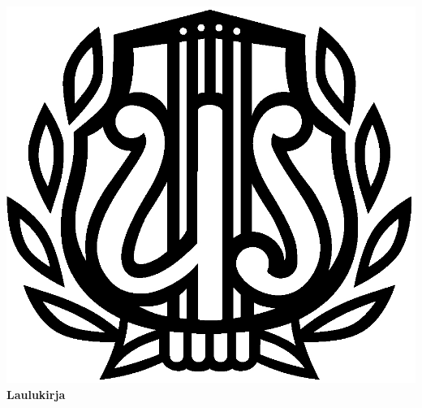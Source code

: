 \documentclass[a4paper,twoside]{book}
\begin{document}
\fontsize{8}{10}\selectfont

\raggedright

\thispagestyle{empty}

\begin{center}
    \includegraphics[page=1, width=0.8\linewidth]{YS_logo}
    \Huge{\textbf{Laulukirja}}
\end{center}

\newpage


\begin{multicols}{2}
    \thispagestyle{empty}




\end{multicols}


\begin{multicols}{2}
    
    \printindex

\end{multicols}

\newpage
\end{document}
